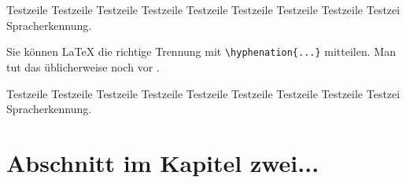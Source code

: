 Testzeile Testzeile Testzeile Testzeile Testzeile Testzeile Testzeile Testzeile Testzei Spracherkennung.

Sie können LaTeX die richtige Trennung mit \verb|\hyphenation{...}| mitteilen. Man tut das üblicherweise noch vor \verb||.

Testzeile Testzeile Testzeile Testzeile Testzeile Testzeile Testzeile Testzeile Testzei Spracherkennung.



\section{Abschnitt im Kapitel zwei...}